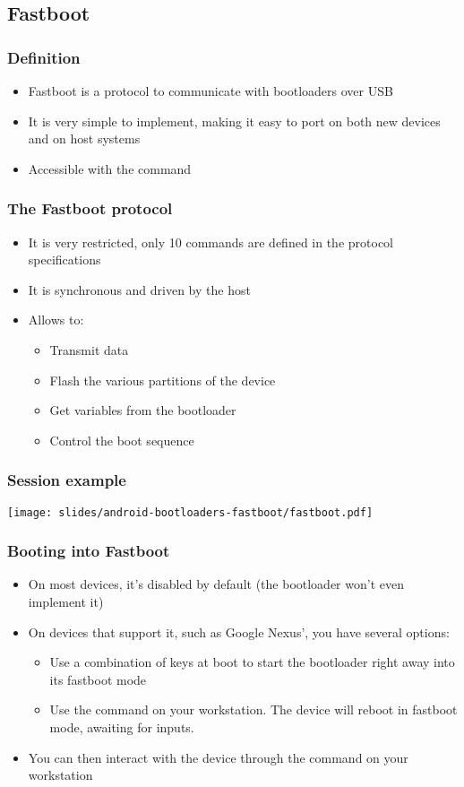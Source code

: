 \subsection{Fastboot}
\begin{frame}
  \frametitle{Definition}
  \begin{itemize}
  \item Fastboot is a protocol to communicate with bootloaders over
    USB
  \item It is very simple to implement, making it easy to port on
    both new devices and on host systems
  \item Accessible with the  command
  \end{itemize}
\end{frame}

\begin{frame}
  \frametitle{The Fastboot protocol}
  \begin{itemize}
  \item It is very restricted, only 10 commands are defined in the
    protocol specifications
  \item It is synchronous and driven by the host
  \item Allows to:
    \begin{itemize}
      \item Transmit data
      \item Flash the various partitions of the device
      \item Get variables from the bootloader
      \item Control the boot sequence
    \end{itemize}
  \end{itemize}
\end{frame}

\begin{frame}
  \frametitle{Session example}
  \begin{center}
    \texttt{[image: slides/android-bootloaders-fastboot/fastboot.pdf]}
  \end{center}
\end{frame}

\begin{frame}
  \frametitle{Booting into Fastboot}
  \begin{itemize}
  \item On most devices, it's disabled by default (the bootloader
    won't even implement it)
  \item On devices that support it, such as Google Nexus', you have
    several options:
    \begin{itemize}
    \item Use a combination of keys at boot to start the bootloader
      right away into its fastboot mode
    \item Use the  command on your
      workstation. The device will reboot in fastboot mode, awaiting
      for inputs.
    \end{itemize}
  \item You can then interact with the device through the
     command on your workstation
  \end{itemize}
\end{frame}

